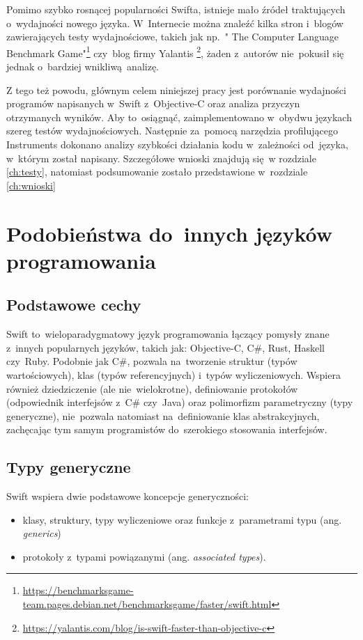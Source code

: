 \documentclass[mgr, shortabstract]{iithesis}
\begin{document}
Pomimo szybko rosnącej popularności Swifta, istnieje mało źródeł traktujących o~wydajności nowego języka. W~Internecie można znaleźć kilka stron i~blogów zawierających testy wydajnościowe, takich jak np.~" The Computer Language Benchmark Game"\footnote{\url{https://benchmarksgame-team.pages.debian.net/benchmarksgame/faster/swift.html}} czy~blog firmy Yalantis \footnote{\url{https://yalantis.com/blog/is-swift-faster-than-objective-c}}, żaden z~autorów nie~pokusił się jednak o~bardziej wnikliwą analizę. 

Z tego też powodu, głównym celem niniejszej pracy jest porównanie wydajności programów napisanych w~Swift z~Objective-C oraz analiza przyczyn otrzymanych wyników. Aby to~osiągnąć, zaimplementowano w~obydwu językach szereg testów wydajnościowych. Następnie za~pomocą narzędzia profilującego Instruments dokonano analizy szybkości działania kodu w~zależności od~języka, w~którym został napisany. Szczegółowe wnioski znajdują się w rozdziale \ref{ch:testy}, natomiast podsumowanie zostało przedstawione w~rozdziale \ref{ch:wnioski}

\chapter{Podobieństwa do~innych języków programowania}
\label{ch:podobienstwa_do_innych}

\section{Podstawowe cechy}
\label{s:podstawowe_cechy}

Swift to~wieloparadygmatowy język programowania łączący pomysły znane z~innych popularnych języków, takich jak: Objective-C, C\#, Rust, Haskell czy~Ruby. Podobnie jak C\#, pozwala na~tworzenie struktur (typów wartościowych), klas (typów referencyjnych) i~typów wyliczeniowych. Wspiera również dziedziczenie (ale nie~wielokrotne), definiowanie protokołów (odpowiednik interfejsów z~C\# czy~Java) oraz polimorfizm parametryczny (typy generyczne), nie~pozwala natomiast na~definiowanie klas abstrakcyjnych, zachęcając tym samym programistów do~szerokiego stosowania interfejsów.

\section{Typy generyczne}
\label{s:typy_generyczne}

Swift wspiera dwie podstawowe koncepcje generyczności:
\begin{itemize}
  \item klasy, struktury, typy wyliczeniowe oraz funkcje z~parametrami typu (ang. \textit{generics})
  \item protokoły z~typami powiązanymi (ang. \textit{associated types}).
\end{itemize}
\end{document}
